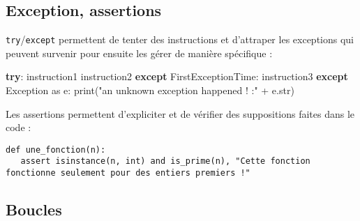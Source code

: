 \documentclass[]{article}
\newenvironment{Shaded}{}{}
\newcommand{\BuiltInTok}[1]{#1}
\newcommand{\ControlFlowTok}[1]{\textcolor[rgb]{0.00,0.44,0.13}{\textbf{#1}}}
\newcommand{\DecValTok}[1]{\textcolor[rgb]{0.25,0.63,0.44}{#1}}
\newcommand{\ImportTok}[1]{#1}
\newcommand{\NormalTok}[1]{#1}
\newcommand{\OperatorTok}[1]{\textcolor[rgb]{0.40,0.40,0.40}{#1}}
\newcommand{\PreprocessorTok}[1]{\textcolor[rgb]{0.74,0.48,0.00}{#1}}
\newcommand{\StringTok}[1]{\textcolor[rgb]{0.25,0.44,0.63}{#1}}
\begin{document}
\begin{Shaded}
\end{Shaded}

\hypertarget{exception-assertions}{%
\subsection{Exception, assertions}\label{exception-assertions}}

\texttt{try}/\texttt{except} permettent de tenter des instructions et
d'attraper les exceptions qui peuvent survenir pour ensuite les gérer de
manière spécifique :

\begin{Shaded}
\begin{Highlighting}[]
\ControlFlowTok{try}\NormalTok{:}
\NormalTok{   instruction1}
\NormalTok{   instruction2}
\ControlFlowTok{except}\NormalTok{ FirstExceptionTime:}
\NormalTok{   instruction3}
\ControlFlowTok{except} \PreprocessorTok{Exception} \ImportTok{as}\NormalTok{ e:}
   \BuiltInTok{print}\NormalTok{(}\StringTok{"an unknown exception happened ! :"} \OperatorTok{+}\NormalTok{ e.}\BuiltInTok{str}\NormalTok{)}
\end{Highlighting}
\end{Shaded}

Les assertions permettent d'expliciter et de vérifier des suppositions
faites dans le code :

\begin{verbatim}
def une_fonction(n):
   assert isinstance(n, int) and is_prime(n), "Cette fonction fonctionne seulement pour des entiers premiers !"
\end{verbatim}

\hypertarget{boucles}{%
\subsection{Boucles}\label{boucles}}
\end{document}
